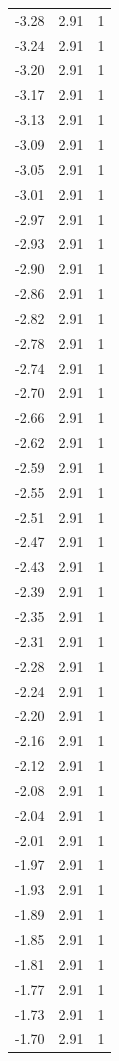 \begin{longtable}{lrr}
  -3.28 & 2.91 & 1 \\
  -3.24 & 2.91 & 1 \\
  -3.20 & 2.91 & 1 \\
  -3.17 & 2.91 & 1 \\
  -3.13 & 2.91 & 1 \\
  -3.09 & 2.91 & 1 \\
  -3.05 & 2.91 & 1 \\
  -3.01 & 2.91 & 1 \\
  -2.97 & 2.91 & 1 \\
  -2.93 & 2.91 & 1 \\
  -2.90 & 2.91 & 1 \\
  -2.86 & 2.91 & 1 \\
  -2.82 & 2.91 & 1 \\
  -2.78 & 2.91 & 1 \\
  -2.74 & 2.91 & 1 \\
  -2.70 & 2.91 & 1 \\
  -2.66 & 2.91 & 1 \\
  -2.62 & 2.91 & 1 \\
  -2.59 & 2.91 & 1 \\
  -2.55 & 2.91 & 1 \\
  -2.51 & 2.91 & 1 \\
  -2.47 & 2.91 & 1 \\
  -2.43 & 2.91 & 1 \\
  -2.39 & 2.91 & 1 \\
  -2.35 & 2.91 & 1 \\
  -2.31 & 2.91 & 1 \\
  -2.28 & 2.91 & 1 \\
  -2.24 & 2.91 & 1 \\
  -2.20 & 2.91 & 1 \\
  -2.16 & 2.91 & 1 \\
  -2.12 & 2.91 & 1 \\
  -2.08 & 2.91 & 1 \\
  -2.04 & 2.91 & 1 \\
  -2.01 & 2.91 & 1 \\
  -1.97 & 2.91 & 1 \\
  -1.93 & 2.91 & 1 \\
  -1.89 & 2.91 & 1 \\
  -1.85 & 2.91 & 1 \\
  -1.81 & 2.91 & 1 \\
  -1.77 & 2.91 & 1 \\
  -1.73 & 2.91 & 1 \\
  -1.70 & 2.91 & 1 \\

\end{longtable}
